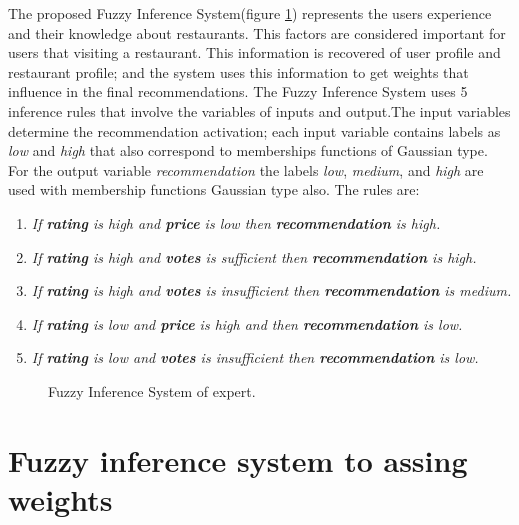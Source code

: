 The proposed Fuzzy Inference System(figure \ref{fig:expertfis})
represents the users experience and their knowledge about restaurants.
This factors are considered important  for users that visiting a
restaurant. This information is recovered of user profile and
restaurant profile; and the system uses this information to get
weights that influence in the final recommendations. The Fuzzy
Inference System uses 5 inference rules that involve the variables of
inputs and output.The input variables determine the recommendation
activation; each input variable contains labels as \textit{low} and
\textit{high} that also correspond to memberships functions of
Gaussian type. For the output variable \textit{recommendation} the
labels \textit{low}, \textit{medium}, and \textit{high} are used with
membership functions Gaussian type also. The rules are:
\begin{enumerate} 
\item \textit{If \textbf{rating} is high and \textbf{price} is low then 
\textbf{recommendation} is high.}
\item \textit{If \textbf{rating} is high and \textbf{votes} is sufficient then 
\textbf{recommendation} is high.}
\item \textit{If \textbf{rating} is high and \textbf{votes} is insufficient then 
\textbf{recommendation} is medium.}
\item \textit{If \textbf{rating} is low and \textbf{price} is high and then 
\textbf{recommendation} is low.} 
\item \textit{If \textbf{rating} is low and \textbf{votes} is insufficient then 
\textbf{recommendation} is low.}
\end{enumerate} 
\begin{figure}
\captionsetup{justification=centering,margin=2cm,font=footnotesize}
\centering
{}
\caption{Fuzzy Inference System of expert.}
\label{fig:expertfis}      
\end{figure}

\section{Fuzzy inference system to assing weights} 

